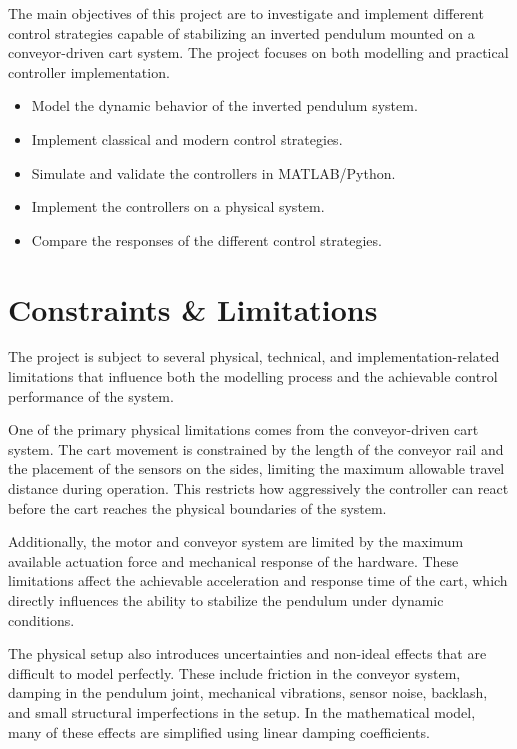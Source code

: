The main objectives of this project are to investigate and implement different control strategies capable of stabilizing an inverted pendulum mounted on a conveyor-driven cart system. The project focuses on both modelling and practical controller implementation.
\begin{itemize}[noitemsep]
	\item Model the dynamic behavior of the inverted pendulum system.
	\item Implement classical and modern control strategies.
	\item Simulate and validate the controllers in MATLAB/Python.
	\item Implement the controllers on a physical system.
	\item Compare the responses of the different control strategies.
\end{itemize}

\newpage

\section{Constraints \& Limitations}
The project is subject to several physical, technical, and implementation-related limitations that influence both the modelling process and the achievable control performance of the system.

One of the primary physical limitations comes from the conveyor-driven cart system. The cart movement is constrained by the length of the conveyor rail and the placement of the sensors on the sides, limiting the maximum allowable travel distance during operation. This restricts how aggressively the controller can react before the cart reaches the physical boundaries of the system.

Additionally, the motor and conveyor system are limited by the maximum available actuation force and mechanical response of the hardware. These limitations affect the achievable acceleration and response time of the cart, which directly influences the ability to stabilize the pendulum under dynamic conditions.

The physical setup also introduces uncertainties and non-ideal effects that are difficult to model perfectly. These include friction in the conveyor system, damping in the pendulum joint, mechanical vibrations, sensor noise, backlash, and small structural imperfections in the setup. In the mathematical model, many of these effects are simplified using linear damping coefficients.

